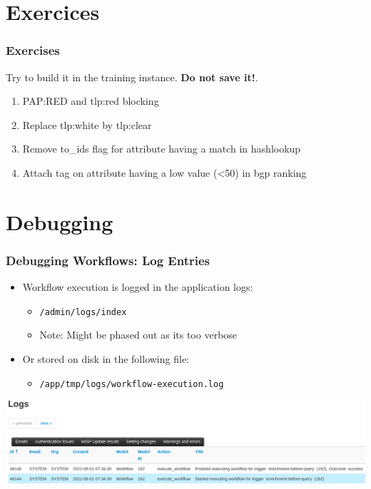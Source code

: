 \section{Exercices}
\begin{frame}
    \frametitle{Exercises}
    Try to build it in the training instance. \textbf{Do not save it!}.
    \vspace{0.5em}
    \begin{enumerate}
        \item PAP:RED and tlp:red blocking
        \item Replace tlp:white by tlp:clear
        \item Remove to\_ids flag for attribute having a match in hashlookup
        \item Attach tag on attribute having a low value (<50) in bgp ranking
    \end{enumerate}
\end{frame}

\section{Debugging}
\begin{frame}
    \frametitle{Debugging Workflows: Log Entries}
    \begin{itemize}
        \item Workflow execution is logged in the application logs:
        \begin{itemize}
            \item \texttt{/admin/logs/index}
            \item Note: Might be phased out as its too verbose
        \end{itemize}
        \item Or stored on disk in the following file:
        \begin{itemize}
            \item \texttt{/app/tmp/logs/workflow-execution.log}
        \end{itemize}
    \end{itemize}
    \begin{center}
        \includegraphics[width=1.0\linewidth]{pictures/workflow-debug.png}
    \end{center}
\end{frame}

